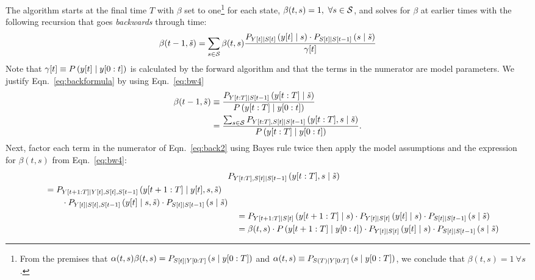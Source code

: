 The algorithm starts at the final time $T$ with $\beta$ set to
one\footnote{From the premises that $\alpha(t,s) \beta(t,s) =
  P_{{S}{[t]}\mid Y[0:T]} \left(s\mid y[0:T] \right)$ and
  $\alpha(t,s) \equiv P_{S(T)\mid Y[0:T]}\left(s \mid y[0:T]
  \right)$, we conclude that $\beta(t,s) = 1 ~\forall s$.} %
for each state, $\beta(t,s) = 1,~\forall s \in \states$, and solves
for $\beta$ at earlier times with the following recursion that goes
\emph{backwards} through time:
\begin{equation}
  \label{eq:backformula}
  \beta(t-1,{\tilde s}) = \sum_{s\in\states} \beta(t,s)
  \frac{ P_{\ti{Y}{t}\given \ti{S}{t}}
    \left(\ti{y}{t}\given s \right) \cdot P_{\ti{S}{t}\given \ti{S}{t-1}}
    \left(s\given {\tilde s} \right)} {\ti{\gamma}{t}}
\end{equation}
Note that ${{\gamma}{[t]} \equiv P \left( {y}{[t]} \mid 
    y[0:t]\right)}$ is calculated by the forward algorithm and
that the terms in the numerator are model parameters.  We justify
Eqn.~\eqref{eq:backformula} by using Eqn.~\eqref{eq:bw4}
\begin{align}
  \beta(t-1,{\tilde s}) & \equiv \frac{P_{\ts{Y}{t}{T}\given \ti{S}{t-1}}
    \left(\ts{y}{t}{T}\given {\tilde s} \right)}
  {P \left(\ts{y}{t}{T}\given \ts{y}{0}{t} \right)} \\
  \mlabel{eq:back2}
  &= \frac{\sum_{s\in\states} P_{\ts{Y}{t}{T},\ti{S}{t}\given \ti{S}{t-1}}
    \left(\ts{y}{t}{T},s\given {\tilde s} \right)} {P
    \left(\ts{y}{t}{T}\given \ts{y}{0}{t} \right)}.
\end{align}
Next, factor each term in the numerator of Eqn.~\eqref{eq:back2} using
Bayes rule twice then apply the model assumptions and the expression
for $\beta(t,s)$ from Eqn.~\eqref{eq:bw4}:
\begin{align*}
  & P_{Y[t:T],{S}{[t]}\mid {S}{[t-1]}}\left( y[t:T],s\mid {\tilde s} \right)\\
  \begin{split}
    &\quad= P_{Y[t+1:T]\mid {Y}{[t]},{S}{[t]},{S}{[t-1]}}
       \left(y[t+1:T]\mid {y}{[t]},s,{\tilde s} \right)\\
    &\quad\qquad \cdot P_{{Y}{[t]}\mid {S}{[t]},{S}{[t-1]}} \left({y}{[t]}\mid s,{\tilde s}
       \right)\cdot P_{{S}{[t]}\mid {S}{[t-1]}} \left(s\mid {\tilde s} \right)
  \end{split}\\
  &\quad= P_{Y[t+1:T]\mid {S}{[t]}} \left(y[t+1:T]\mid s\right)
           \cdot P_{{Y}{[t]}\mid {S}{[t]}} \left({y}{[t]}\mid s \right) \cdot
            P_{{S}{[t]}\mid {S}{[t-1]}} \left(s\mid {\tilde s} \right) \\
  &\quad= \beta(t,s) \cdot P \left(y[t+1:T]\mid y[0:t] \right)
           \cdot P_{{Y}{[t]}\mid {S}{[t]}} \left({y}{[t]}\mid s \right) \cdot
            P_{{S}{[t]}\mid {S}{[t-1]}} \left(s\mid {\tilde s} \right)
\end{align*}
